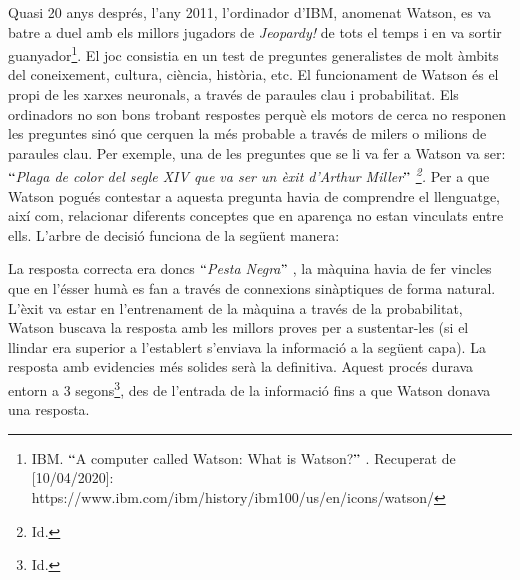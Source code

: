 \documentclass[12pt]{article}
\begin{document}
\begin{enumerate}
\vspace{\baselineskip}
Quasi 20 anys després, l’any 2011, l’ordinador d’IBM, anomenat Watson, es va batre a duel amb els millors jugadors de \textit{Jeopardy!} de tots el temps i en va sortir guanyador\footnote{ IBM. $``$A computer called Watson: What is Watson?$"$ . Recuperat de [10/04/2020]: https://www.ibm.com/ibm/history/ibm100/us/en/icons/watson/  }. El joc consistia en un test de preguntes generalistes de molt àmbits del coneixement, cultura, ciència, història, etc. El funcionament de Watson és el propi de les xarxes neuronals, a través de paraules clau i probabilitat. Els ordinadors no son bons trobant respostes perquè els motors de cerca no responen les preguntes sinó que cerquen la més probable a través de milers o milions de paraules clau.  Per exemple, una de les preguntes que se li va fer a Watson va ser: \textit{$``$Plaga de color del segle XIV que va ser un èxit d’Arthur Miller$"$ \footnote{ Id. }. }Per a que Watson pogués contestar a aquesta pregunta havia de comprendre el llenguatge, així com, relacionar diferents conceptes que en aparença no estan vinculats entre ells. L’arbre de decisió funciona de la següent manera: \par


\vspace{\baselineskip}La resposta correcta era doncs $``$\textit{Pesta Negra}$"$ , la màquina havia de fer vincles que en l’ésser humà es fan a través de connexions sinàptiques de forma natural. L’èxit va estar en l’entrenament de la màquina a través de la probabilitat, Watson buscava la resposta amb les millors proves per a sustentar-les (si el llindar era superior a l’establert s’enviava la informació a la següent capa). La resposta amb evidencies més solides serà la definitiva. Aquest procés durava entorn a 3 segons\footnote{ Id. }, des de l’entrada de la informació fins a que Watson donava una resposta.\par



\end{enumerate}
\end{document}
